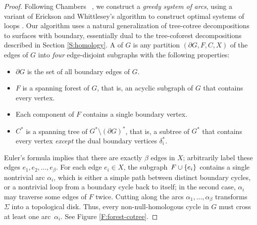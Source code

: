 \documentclass[twoside,leqno,twocolumn]{article}
\let\primalarc\alpha
\begin{document}
{\begin{proof}
Following Chambers \etal~\cite{splitting}, we construct a \emph{greedy system of arcs}, using a variant of Erickson and Whittlesey's algorithm to construct optimal systems of loops \cite{gohog}.  Our algorithm uses a natural generalization of tree-cotree decompositions~\cite{e-dgteg-03} to surfaces with boundary, essentially dual to the tree-coforest decompositions described in Section \ref{S:homology}.  A  of $G$ is any partition $(\partial\! G, F, C, X)$ of the edges of $G$ into \emph{four} edge-disjoint subgraphs with the following properties:
\begin{itemize}\itemsep0pt
\item $\partial\! G$ is the set of all boundary edges of $G$.
\item $F$ is a spanning forest of $G$, that is, an acyclic subgraph of $G$ that contains every vertex.
\item Each component of $F$ contains a single boundary vertex.
\item $C^*$ is a spanning tree of $G^*\setminus (\partial G)^*$, that is, a subtree of $G^*$ that contains every vertex \emph{except} the dual boundary vertices $\delta_i^*$.
\end{itemize}
Euler's formula implies that there are exactly $\beta$ edges in $X$; arbitrarily label these edges $e_1, e_2, \dots, e_\beta$.  For each edge $e_i\in X$, the subgraph~$F\cup \{ e_i \}$ contains a single nontrivial arc $\primalarc_i$, which is either a simple path between distinct boundary cycles, or a nontrivial loop from a boundary cycle back to itself; in the second case, $\primalarc_i$ may traverse some edges of $F$ twice.  Cutting along the arcs $\primalarc_1, \dots, \primalarc_\beta$ transforms~$\Sigma$ into a topological disk.  Thus, every non-null-homologous cycle in $G$ must cross at least one arc~$\primalarc_i$.   See Figure \ref{F:forest-cotree}.


\end{proof}}
\end{document}
